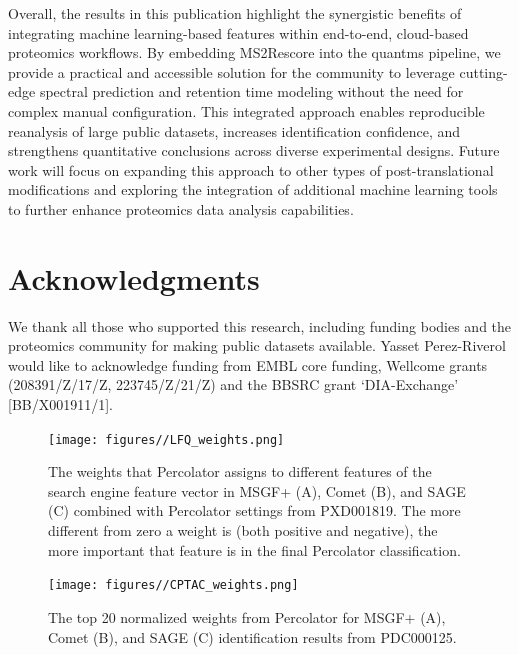 \documentclass[12pt]{article}
\begin{document}
Overall, the results in this publication highlight the synergistic benefits of integrating machine learning-based features within end-to-end, cloud-based proteomics workflows. By embedding MS2Rescore into the quantms pipeline, we provide a practical and accessible solution for the community to leverage cutting-edge spectral prediction and retention time modeling without the need for complex manual configuration. This integrated approach enables reproducible reanalysis of large public datasets, increases identification confidence, and strengthens quantitative conclusions across diverse experimental designs. Future work will focus on expanding this approach to other types of post-translational modifications and exploring the integration of additional machine learning tools to further enhance proteomics data analysis capabilities.

\section*{Acknowledgments}
We thank all those who supported this research, including funding bodies and the proteomics community for making public datasets available. 
Yasset Perez-Riverol would like to acknowledge funding from EMBL core funding, Wellcome grants (208391/Z/17/Z, 223745/Z/21/Z) and the BBSRC grant ‘DIA-Exchange’ [BB/X001911/1].



\renewcommand\thefigure{S\arabic{figure}}
\setcounter{figure}{0}

\begin{figure}[ht!]
	\centering
	\texttt{[image: figures//LFQ\_weights.png]}
	\caption{The weights that Percolator assigns to different features of the search engine feature vector in MSGF+ (A), Comet (B), and SAGE (C) combined with Percolator settings from PXD001819. The more different from zero a weight is (both positive and negative), the more important that feature is in the final Percolator classification.}
	\label{fig:PXD001819_svm_weights}
\end{figure}

\begin{figure}[ht!]
	\centering
	\texttt{[image: figures//CPTAC\_weights.png]}
	\caption{The top 20 normalized weights from Percolator for MSGF+ (A), Comet (B), and SAGE (C) identification results from PDC000125.}
	\label{fig:PDC_ms2rescore_weights}
\end{figure}
\end{document}
